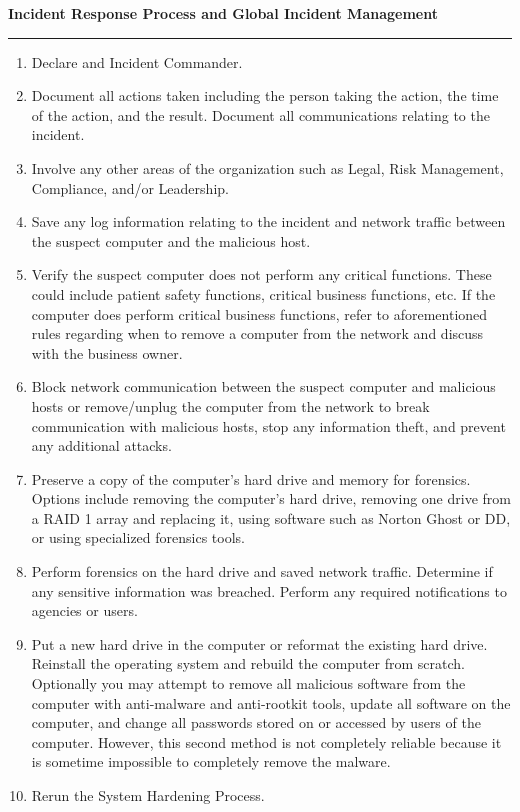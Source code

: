 \begin{mdframed}
\textbf{Incident Response Process and Global Incident Management}
\hrule
\begin{enumerate}
\item Declare and Incident Commander.
\item Document all actions taken including the person taking the action, the time of the action, and the result. Document all communications relating to the incident.
\item Involve any other areas of the organization such as Legal, Risk Management, Compliance, and/or Leadership.
\item Save any log information relating to the incident and network traffic between the suspect computer and the malicious host.
\item Verify the suspect computer does not perform any critical functions. These could include patient safety functions, critical business functions, etc. If the computer does perform critical business functions, refer to aforementioned rules regarding when to remove a computer from the network and discuss with the business owner.
\item Block network communication between the suspect computer and malicious hosts or remove/unplug the computer from the network to break communication with malicious hosts, stop any information theft, and prevent any additional attacks.
\item Preserve a copy of the computer's hard drive and memory for forensics. Options include removing the computer's hard drive, removing one drive from a RAID 1 array and replacing it, using software such as Norton Ghost or DD, or using specialized forensics tools.
\item Perform forensics on the hard drive and saved network traffic. Determine if any sensitive information was breached. Perform any required notifications to agencies or users.
\item Put a new hard drive in the computer or reformat the existing hard drive. Reinstall the operating system and rebuild the computer from scratch. Optionally you may attempt to remove all malicious software from the computer with anti-malware and anti-rootkit tools, update all software on the computer, and change all passwords stored on or accessed by users of the computer. However, this second method is not completely reliable because it is sometime impossible to completely remove the malware.
\item Rerun the System Hardening Process.
\end{enumerate}
\end{mdframed}
